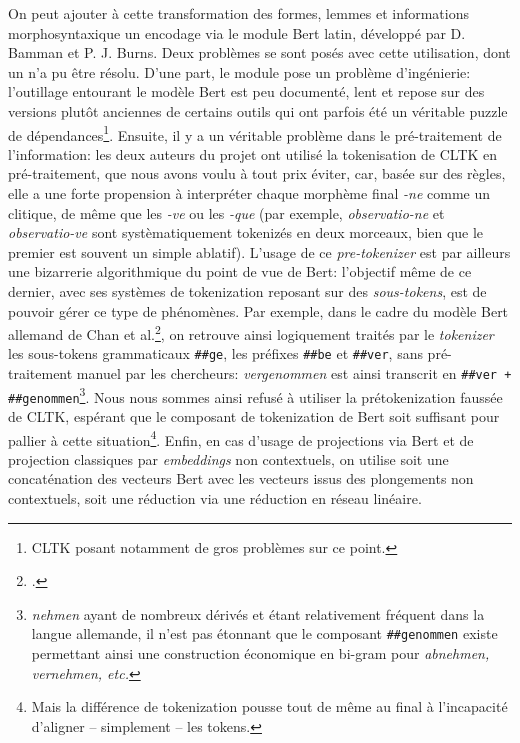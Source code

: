 On peut ajouter à cette transformation des formes, lemmes et informations morphosyntaxique un encodage via le module Bert latin, développé par D. Bamman et P. J. Burns. Deux problèmes se sont posés avec cette utilisation, dont un n'a pu être résolu. D'une part, le module pose un problème d'ingénierie: l'outillage entourant le modèle Bert est peu documenté, lent et repose sur des versions plutôt anciennes de certains outils qui ont parfois été un véritable puzzle de dépendances\footnote{CLTK posant notamment de gros problèmes sur ce point.}. Ensuite, il y a un véritable problème dans le pré-traitement de l'information: les deux auteurs du projet ont utilisé la tokenisation de CLTK en pré-traitement, que nous avons voulu à tout prix éviter, car, basée sur des règles, elle a une forte propension à interpréter chaque morphème final \textit{-ne} comme un clitique, de même que les \textit{-ve} ou les \textit{-que} (par exemple, \textit{observatio-ne} et \textit{observatio-ve} sont systèmatiquement tokenizés en deux morceaux, bien que le premier est souvent un simple ablatif). L'usage de ce \textit{pre-tokenizer} est par ailleurs une bizarrerie algorithmique du point de vue de Bert: l'objectif même de ce dernier, avec ses systèmes de tokenization reposant sur des \textit{sous-tokens}, est de pouvoir gérer ce type de phénomènes. Par exemple, dans le cadre du modèle Bert allemand de Chan et al.\footcite{chan_german_2019}, on retrouve ainsi logiquement traités par le \textit{tokenizer} les sous-tokens grammaticaux \texttt{\#\#ge}, les préfixes \texttt{\#\#be} et \texttt{\#\#ver}, sans pré-traitement manuel par les chercheurs: \textit{vergenommen} est ainsi transcrit en \texttt{\#\#ver + \#\#genommen}\footnote{\textit{nehmen} ayant de nombreux dérivés et étant relativement fréquent dans la langue allemande, il n'est pas étonnant que le composant \texttt{\#\#genommen} existe permettant ainsi une construction économique en bi-gram pour \textit{abnehmen, vernehmen, etc.}}. Nous nous sommes ainsi refusé à utiliser la prétokenization faussée de CLTK, espérant que le composant de tokenization de Bert soit suffisant pour pallier à cette situation\footnote{Mais la différence de tokenization pousse tout de même au final à l'incapacité d'aligner -- simplement -- les tokens.}. Enfin, en cas d'usage de projections via Bert et de projection classiques par \textit{embeddings} non contextuels, on utilise soit une concaténation des vecteurs Bert avec les vecteurs issus des plongements non contextuels, soit une réduction via une réduction en réseau linéaire.

